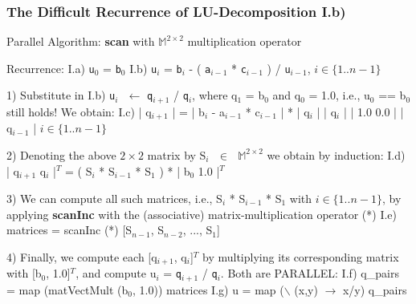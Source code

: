 \documentclass{beamer}
\renewcommand{\emph}[1]{\textcolor{structure}{#1}}
\newcommand{\mymath}[1]{$ #1 $}
\newcommand{\myindx}[1]{_{#1}}
\newcommand{\myindu}[1]{^{#1}}
\begin{document}
\begin{frame}[fragile,t]
  \frametitle{The Difficult Recurrence of LU-Decomposition I.b) }

\begin{block}{ Parallel Algorithm: {\bf scan} with $\mathbb{M}^{2\times 2}$ multiplication operator} 
\begin{colorcode}[fontsize=\scriptsize]
Recurrence:
    I.a) {\tt u}\mymath{\myindx{0}} = {\tt b}\mymath{\myindx{0}}
    I.b) {\tt u}\mymath{\myindx{i}} = {\tt b}\mymath{\myindx{i}} - ( {\tt a}\mymath{\myindx{i-1}} * {\tt c}\mymath{\myindx{i-1}} ) / {\tt u}\mymath{\myindx{i-1}},  \mymath{i \in \{1 .. n-1\}} 

1) Substitute in I.b) {\tt u}\mymath{\myindx{i}\mbox{ }\leftarrow} {\tt q}\mymath{\myindx{i+1}} / {\tt q}\mymath{\myindx{i}}, 
        where q\mymath{\myindx{1}} = b\mymath{\myindx{0}} and q\mymath{\myindx{0}} = 1.0, i.e., u\mymath{\myindx{0}} == b\mymath{\myindx{0}} still holds! \emph{We obtain:}
    I.c) | q\mymath{\myindx{i+1}} | = | b\mymath{\myindx{i}}      - a\mymath{\myindx{i-1}} * c\mymath{\myindx{i-1}} | * | q\mymath{\myindx{i}}   |    
         | q\mymath{\myindx{i}}   |   | 1.0     0.0          |   | q\mymath{\myindx{i-1}} |    \mymath{i \in \{1 .. n-1\}}

2) Denoting the above \mymath{2\times 2} matrix by S\mymath{\myindx{i}\mbox{ }\in\mbox{ }\mathbb{M}\myindu{2\times{}2}} we obtain by induction:
    I.d) | q\mymath{\myindx{i+1}}  q\mymath{\myindx{i}} |\mymath{\myindu{T}} = ( S\mymath{\myindx{i}} * S\mymath{\myindx{i-1}} * S\mymath{\myindx{1}} ) * | b\mymath{\myindx{0}} 1.0 |\mymath{\myindu{T}}

3) We can compute all such matrices, i.e., S\mymath{\myindx{i}} * S\mymath{\myindx{i-1}} * S\mymath{\myindx{1}} with \mymath{i\in\{1..n-1\}}, 
   by applying {\bf{}scanInc} with the (associative) matrix-multiplication operator (*)
    I.e) matrices = scanInc (*) [S\mymath{\myindx{n-1}}, S\mymath{\myindx{n-2}}, ..., S\mymath{\myindx{1}}]

4) Finally, we compute each [q\mymath{\myindx{i+1}}, q\mymath{\myindx{i}}]\mymath{\myindu{T}} by multiplying its corresponding 
   matrix with [b\mymath{\myindx{0}}, 1.0]\mymath{\myindu{T}}, and compute u\mymath{\myindx{i}} = {\tt q}\mymath{\myindx{i+1}} / {\tt q}\mymath{\myindx{i}}. \emph{Both are PARALLEL:}
    I.f) q_pairs = map (matVectMult (b\mymath{\myindx{0}}, 1.0)) matrices
    I.g) u       = map (\mymath{\backslash} (x,y) \mymath{\rightarrow} x/y) q_pairs
\end{colorcode}
\end{block}



\end{frame}
\end{document}
